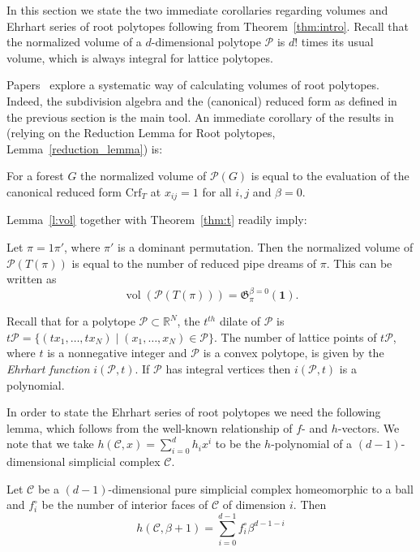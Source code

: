 \documentclass[ALCO,ThmDefs]{cedram}
\numberwithin{equation}{section}
\DeclareMathOperator{\vol}{vol}
\newcommand*{\Crf}{\mathrm{Crf}}
\newcommand*\C{{\mathcal{C}}}
\renewcommand*\P{{\mathcal{P}}}
\newcommand*\+{\smash{\lower2pt\hbox{\rlap{\vrule height14pt}}\raise2pt\hbox{\rlap{\hskip-3pt \vrule height.4pt depth0pt width14.7pt}}}}
\begin{document}
In this section we state the two immediate corollaries regarding volumes and Ehrhart series of root polytopes following from Theorem~\ref{thm:intro}. Recall that the normalized volume of a $d$-dimensional polytope $\P$ is $d!$ times its usual volume, which is always integral for lattice polytopes.

Papers~\cite{root1, root2} explore a systematic way of calculating volumes of root polytopes. Indeed, the subdivision algebra and the (canonical) reduced form as defined in the previous section is the main tool. An immediate corollary of the results in~\cite{root1} (relying on the Reduction Lemma for Root polytopes, Lemma~\ref{reduction_lemma}) is:

\begin{lemm}\label{l:vol}
For a forest $G$ the normalized volume of $\P(G)$ is equal to the evaluation of the canonical reduced form $\Crf_T$ at $x_{ij}=1$ for all $i,j$ and $\beta=0$.
\end{lemm}

Lemma~\ref{l:vol} together with Theorem~\ref{thm:t} readily imply:

\begin{theo}\label{thm:vol}
Let $\pi=1\pi'$, where $\pi'$ is a dominant permutation. Then the normalized volume of $\P(T(\pi))$ is equal to the number of reduced pipe dreams of $\pi$. This can be written as
\begin{equation}
\vol(\P(T(\pi)))=\mathfrak{G}^{\beta=0}_{\pi} (\mathbf{1}).
\end{equation}
\end{theo}

Recall that for a polytope $\mathcal{P}\subset \mathbb{R}^{N}$, the {$t^{th}$ dilate} of $\mathcal{P}$ is $\displaystyle t \mathcal{P}=\{(tx_1, \dots, tx_{N}) \mid (x_1, \dots, x_{N}) \in \mathcal{P}\}.$ The number of lattice points of $t\mathcal{P}$, where $t$ is a nonnegative integer and $\mathcal{P}$ is a convex polytope, is given by the \emph{Ehrhart function} $i({\mathcal{P}}, t)$. If $\mathcal{P}$ has integral vertices then $i({\mathcal{P}}, t)$ is a polynomial.

In order to state the Ehrhart series of root polytopes we need the following lemma, which follows from the well-known relationship of $f$- and $h$-vectors. We note that we take $h(\C, x)=\sum_{i=0}^d h_{i}x^{i}$ to be the $h$-polynomial of a $(d-1)$-dimensional simplicial complex $\C$.

\begin{lemm} \label{pure}
Let $\C$ be a $(d-1)$-dimensional pure simplicial complex homeomorphic to a ball and $f_i^\circ$ be the number of interior faces of $\C$ of dimension $i$. Then
\begin{equation}\label{h}
h(\C, \beta+1)=\sum_{i=0}^{d-1} f_i^\circ \beta^{d-1-i}
\end{equation}
\end{lemm}
\end{document}
